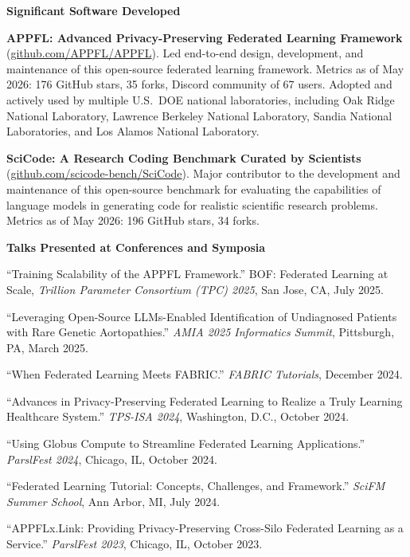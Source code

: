 \documentclass[letterpaper,11pt]{article}
\newcommand{\PubSection}[1]{%
  \vspace{6pt}\noindent\textbf{#1}\vspace{3pt}%
}
\begin{document}
\PubSection{Significant Software Developed}
\begin{enumerate}[leftmargin=1cm, label={[\arabic*]}, itemsep=3pt]
  \small
  \item \textbf{APPFL: Advanced Privacy-Preserving Federated Learning Framework} (\href{https://github.com/APPFL/APPFL}{github.com/APPFL/APPFL}). Led end-to-end design, development, and maintenance of this open-source federated learning framework. Metrics as of May 2026: 176 GitHub stars, 35 forks, Discord community of 67 users. Adopted and actively used by multiple U.S.\ DOE national laboratories, including Oak Ridge National Laboratory, Lawrence Berkeley National Laboratory, Sandia National Laboratories, and Los Alamos National Laboratory.

  \item \textbf{SciCode: A Research Coding Benchmark Curated by Scientists} (\href{https://github.com/scicode-bench/SciCode}{github.com/scicode-bench/SciCode}). Major contributor to the development and maintenance of this open-source benchmark for evaluating the capabilities of language models in generating code for realistic scientific research problems. Metrics as of May 2026: 196 GitHub stars, 34 forks.
\end{enumerate}

\PubSection{Talks Presented at Conferences and Symposia}
\begin{enumerate}[leftmargin=1cm, label={[\arabic*]}, itemsep=3pt]
  \small
  \item ``Training Scalability of the APPFL Framework.'' BOF: Federated Learning at Scale, \textit{Trillion Parameter Consortium (TPC) 2025}, San Jose, CA, July 2025.

  \item ``Leveraging Open-Source LLMs-Enabled Identification of Undiagnosed Patients with Rare Genetic Aortopathies.'' \textit{AMIA 2025 Informatics Summit}, Pittsburgh, PA, March 2025.

  \item ``When Federated Learning Meets FABRIC.'' \textit{FABRIC Tutorials}, December 2024.

  \item ``Advances in Privacy-Preserving Federated Learning to Realize a Truly Learning Healthcare System.'' \textit{TPS-ISA 2024}, Washington, D.C., October 2024.

  \item ``Using Globus Compute to Streamline Federated Learning Applications.'' \textit{ParslFest 2024}, Chicago, IL, October 2024.

  \item ``Federated Learning Tutorial: Concepts, Challenges, and Framework.'' \textit{SciFM Summer School}, Ann Arbor, MI, July 2024.

  \item ``APPFLx.Link: Providing Privacy-Preserving Cross-Silo Federated Learning as a Service.'' \textit{ParslFest 2023}, Chicago, IL, October 2023.
\end{enumerate}
\end{document}
